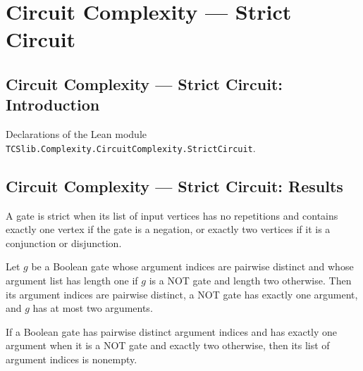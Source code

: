 \section{Circuit Complexity --- Strict Circuit}
\subsection*{Circuit Complexity --- Strict Circuit: Introduction}

Declarations of the Lean module \texttt{TCSlib.Complexity.CircuitComplexity.StrictCircuit}.

\subsection*{Circuit Complexity --- Strict Circuit: Results}

\begin{definition}
\label{BoolCircuit.DAGGate.Strict}
\leanok
{}
A gate is strict when its list of input vertices has no repetitions and contains exactly
one vertex if the gate is a negation, or exactly two vertices if it is a conjunction or
disjunction.
\end{definition}

\begin{theorem}
\label{BoolCircuit.DAGGate.Strict.faninTwo}
\leanok
{}
Let $g$ be a Boolean gate whose argument indices are pairwise distinct and whose
argument list has length one if $g$ is a NOT gate and length two otherwise. Then its
argument indices are pairwise distinct, a NOT gate has exactly one argument, and $g$ has
at most two arguments.
\end{theorem}

\begin{theorem}
\label{BoolCircuit.DAGGate.Strict.args_ne_nil}
\leanok
{}
If a Boolean gate has pairwise distinct argument indices and has exactly one argument
when it is a NOT gate and exactly two otherwise, then its list of argument indices is
nonempty.
\end{theorem}

